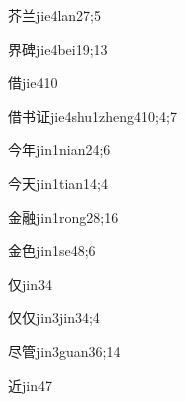 \begin{verbete}{芥兰}{jie4lan2}{7;5}
\end{verbete}

\begin{verbete}{界碑}{jie4bei1}{9;13}
\end{verbete}

\begin{verbete}{借}{jie4}{10}
\end{verbete}

\begin{verbete}{借书证}{jie4shu1zheng4}{10;4;7}
\end{verbete}

\begin{verbete}{今年}{jin1nian2}{4;6}
\end{verbete}

\begin{verbete}{今天}{jin1tian1}{4;4}
\end{verbete}

\begin{verbete}{金融}{jin1rong2}{8;16}
\end{verbete}

\begin{verbete}{金色}{jin1se4}{8;6}
\end{verbete}

\begin{verbete}{仅}{jin3}{4}
\end{verbete}

\begin{verbete}{仅仅}{jin3jin3}{4;4}
\end{verbete}

\begin{verbete}{尽管}{jin3guan3}{6;14}
\end{verbete}

\begin{verbete}{近}{jin4}{7}
\end{verbete}

